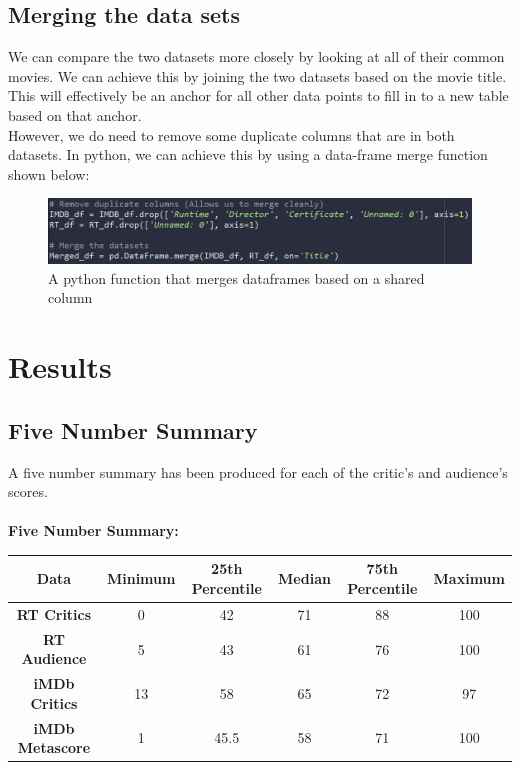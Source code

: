 \documentclass[12pt]{article}
\begin{document}
\newpage

\subsection{Merging the data sets}
We can compare the two datasets more closely by looking at all of their common movies. We can achieve this by joining the two datasets based on the movie title. This will effectively be an anchor for all other data points to fill in to a new table based on that anchor. \\

\noindent However, we do need to remove some duplicate columns that are in both datasets. In python, we can achieve this by using a data-frame merge function shown below:
\begin{figure}[h]
\begin{center}
      \includegraphics[width=6in]{figure6.png}
      \caption{A python function that merges dataframes based on a shared column}
      \label{Figure 6}
\end{center}
\end{figure}

\section{Results}

\subsection{Five Number Summary}
A five number summary has been produced for each of the critic's and audience's scores. \\ \\

\noindent \textbf{Five Number Summary:}
\begin{center}
\begin{tabular}{|c|c|c|c|c|c|} 
\hline
\textbf{Data} & \textbf{Minimum} & \textbf{25th Percentile} & \textbf{Median} & \textbf{75th Percentile} & \textbf{Maximum} \\
\hline
\textbf{RT Critics} & 0 & 42 & 71 & 88 & 100 \\
\hline
\textbf{RT Audience} & 5 & 43 & 61 & 76 & 100 \\
\hline
\textbf{iMDb Critics} & 13 & 58 & 65 & 72 & 97 \\
\hline
\textbf{iMDb Metascore} & 1 & 45.5 & 58 & 71 & 100 \\
\hline
\end{tabular}
\end{center}
\end{document}
